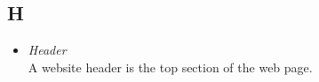 \subsection*{H}
\begin{itemize}
    \item \textit{Header} \\ A website header is the top section of the web page.
\end{itemize}